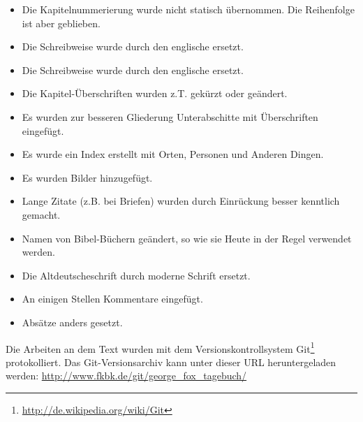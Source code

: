 \begin{itemize}
 \item Die Kapitelnummerierung wurde nicht statisch übernommen. Die 
  Reihenfolge ist aber geblieben.
 \item Die Schreibweise  wurde durch den englische 
   ersetzt.
 \item Die Schreibweise  wurde durch den englische  
   ersetzt.
 \item Die Kapitel-Überschriften wurden z.T. gekürzt oder geändert.
 \item Es wurden zur besseren Gliederung Unterabschitte mit Überschriften eingefügt.
 \item Es wurde ein Index erstellt mit Orten, Personen und Anderen
  Dingen.
 \item Es wurden Bilder hinzugefügt.
 \item Lange Zitate (z.B. bei Briefen) wurden durch Einrückung besser  
  kenntlich gemacht.
 \item Namen von Bibel-Büchern geändert, so wie sie Heute in der Regel
  verwendet werden.
 \item Die Altdeutscheschrift durch moderne Schrift ersetzt.
 \item An einigen Stellen Kommentare eingefügt.
 \item Absätze anders gesetzt.
\end{itemize}

Die Arbeiten an dem
Text wurden mit dem Versionskontrollsystem 
Git\footnote{\url{http://de.wikipedia.org/wiki/Git}} protokolliert.
Das Git-Versionsarchiv kann unter dieser URL heruntergeladen werden:
\url{http://www.fkbk.de/git/george_fox_tagebuch/}  
